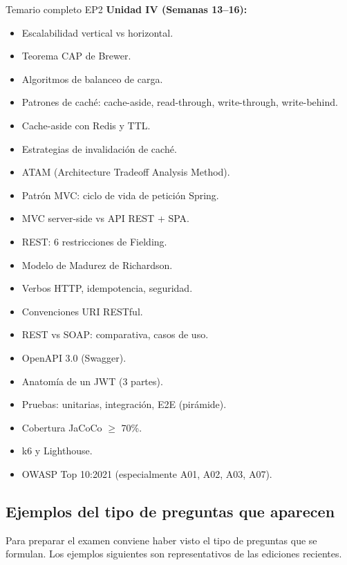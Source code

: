 \documentclass[11pt,a4paper,openany]{book}
\begin{document}
\begin{cajaadvertencia}{Temario completo EP2}
\textbf{Unidad IV (Semanas 13--16):}
\begin{itemize}
\item Escalabilidad vertical vs horizontal.
\item Teorema CAP de Brewer.
\item Algoritmos de balanceo de carga.
\item Patrones de caché: cache-aside, read-through, write-through,
write-behind.
\item Cache-aside con Redis y TTL.
\item Estrategias de invalidación de caché.
\item ATAM (Architecture Tradeoff Analysis Method).
\item Patrón MVC: ciclo de vida de petición Spring.
\item MVC server-side vs API REST + SPA.
\item REST: 6 restricciones de Fielding.
\item Modelo de Madurez de Richardson.
\item Verbos HTTP, idempotencia, seguridad.
\item Convenciones URI RESTful.
\item REST vs SOAP: comparativa, casos de uso.
\item OpenAPI 3.0 (Swagger).
\item Anatomía de un JWT (3 partes).
\item Pruebas: unitarias, integración, E2E (pirámide).
\item Cobertura JaCoCo $\geq$ 70\%.
\item k6 y Lighthouse.
\item OWASP Top 10:2021 (especialmente A01, A02, A03, A07).
\end{itemize}
\end{cajaadvertencia}

\subsection{Ejemplos del tipo de preguntas que aparecen}

Para preparar el examen conviene haber visto el tipo de
preguntas que se formulan. Los ejemplos siguientes son
representativos de las ediciones recientes.
\end{document}
